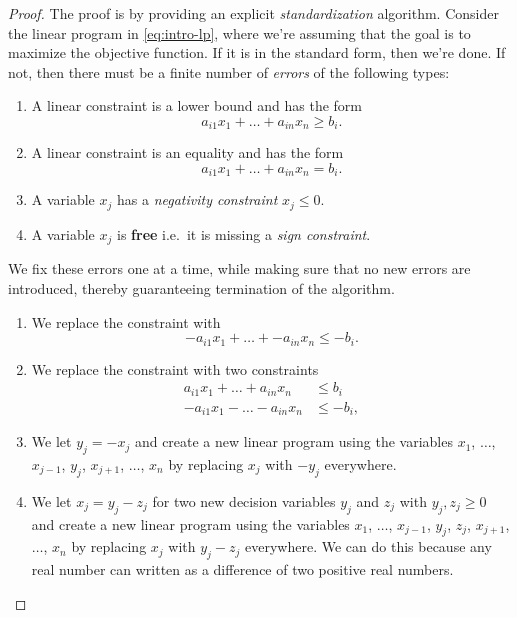 \documentclass[
]{book}
\providecommand{\tightlist}{%
  \setlength{\itemsep}{0pt}\setlength{\parskip}{0pt}}
\theoremstyle{definition}
\theoremstyle{definition}
\theoremstyle{definition}
\theoremstyle{definition}
\theoremstyle{remark}
\begin{document}
\begin{proof}

The proof is by providing an explicit \emph{standardization} algorithm. Consider the linear program in \eqref{eq:intro-lp}, where we're assuming that the goal is to maximize the objective function. If it is in the standard form, then we're done. If not, then there must be a finite number of \emph{errors} of the following types:

\begin{enumerate}
\def\labelenumi{\arabic{enumi}.}
\tightlist
\item
  A linear constraint is a lower bound and has the form \[a_{i1} x_1 + \dots + a_{in} x_n \geq b_i.\]
\item
  A linear constraint is an equality and has the form \[a_{i1} x_1 + \dots + a_{in} x_n = b_i.\]
\item
  A variable \(x_j\) has a \emph{negativity constraint} \(x_j \leq 0\).
\item
  A variable \(x_j\) is \textbf{free} i.e.~it is missing a \emph{sign constraint}.
\end{enumerate}

We fix these errors one at a time, while making sure that no new errors are introduced, thereby guaranteeing termination of the algorithm.

\begin{enumerate}
\def\labelenumi{\arabic{enumi}.}
\tightlist
\item
  We replace the constraint with \[ -a_{i1} x_1 + \dots + -a_{in} x_n \leq -b_i. \]
\item
  We replace the constraint with two constraints
  \begin{align*}
    a_{i1} x_1 + \dots + a_{in} x_n &\leq b_i \\
    -a_{i1} x_1 - \dots - a_{in} x_n &\leq -b_i,
    \end{align*}
\item
  We let \(y_j = -x_j\) and create a new linear program using the variables \(x_1\), \(\dots\), \(x_{j-1}\), \(y_j\), \(x_{j+1}\), \(\dots\), \(x_n\) by replacing \(x_j\) with \(-y_j\) everywhere.
\item
  We let \(x_j = y_j - z_j\) for two new decision variables \(y_j\) and \(z_j\) with \(y_j, z_j \geq 0\) and create a new linear program using the variables \(x_1\), \(\dots\), \(x_{j-1}\), \(y_j\), \(z_j\), \(x_{j+1}\), \(\dots\), \(x_n\) by replacing \(x_j\) with \(y_j - z_j\) everywhere. We can do this because any real number can written as a difference of two positive real numbers.
\end{enumerate}

\end{proof}
\end{document}
